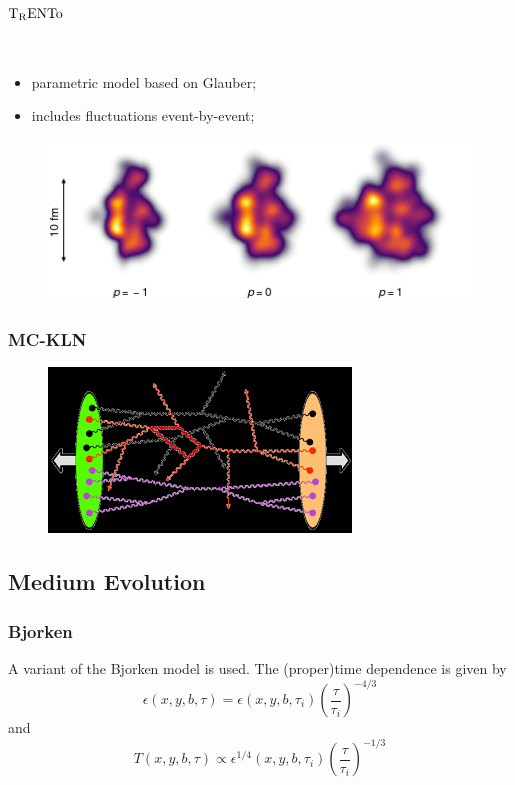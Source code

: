 \documentclass{beamer}
\begin{document}
\begin{frame}\frametitle{$\rm T_{R}ENTo$}
	 \\
	\begin{itemize}
	\item<2-> parametric model based on Glauber;
	\item<3-> includes fluctuations event-by-event;
	\end{itemize}
	\begin{figure}[b]
	\includegraphics[width=1\textwidth]{images/trento_events_p.png}
	\end{figure}
\end{frame}

\begin{frame}\frametitle{MC-KLN}
	\begin{figure}[b]
	\includegraphics[height=0.3\paperheight]{images/kln.png}
	\end{figure}
\end{frame}

\subsection{Medium Evolution}
\begin{frame}\frametitle{Bjorken}
	A variant of the Bjorken model is used. The (proper)time dependence is given by
	\begin{equation*}
	\epsilon (x,y,b,\tau)=\epsilon(x,y,b,\tau_i) \left(\frac{\tau}{\tau_i} \right)^{-4/3}
	\end{equation*}
	and
	\begin{equation*}
	T (x,y,b,\tau)\propto\epsilon^{1/4}(x,y,b,\tau_i) \left(\frac{\tau}{\tau_i} \right)^{-1/3}
	\end{equation*}
\end{frame}
\end{document}
